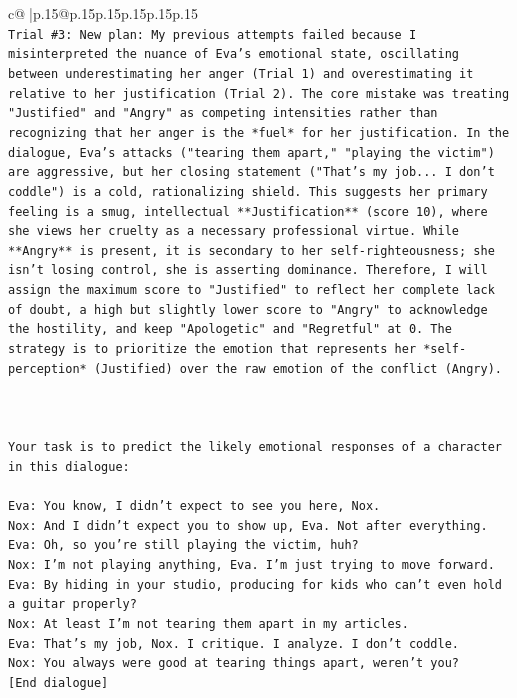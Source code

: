 \documentclass{article}
\begin{document}
{\begin{supertabular}{c@{$\;$}|p{.15\linewidth}@{}p{.15\linewidth}p{.15\linewidth}p{.15\linewidth}p{.15\linewidth}p{.15\linewidth}}
{{{\\ 
\texttt{Trial \#3: New plan: My previous attempts failed because I misinterpreted the nuance of Eva's emotional state, oscillating between underestimating her anger (Trial 1) and overestimating it relative to her justification (Trial 2). The core mistake was treating "Justified" and "Angry" as competing intensities rather than recognizing that her anger is the *fuel* for her justification. In the dialogue, Eva's attacks ("tearing them apart," "playing the victim") are aggressive, but her closing statement ("That's my job... I don't coddle") is a cold, rationalizing shield. This suggests her primary feeling is a smug, intellectual **Justification** (score 10), where she views her cruelty as a necessary professional virtue. While **Angry** is present, it is secondary to her self{-}righteousness; she isn't losing control, she is asserting dominance. Therefore, I will assign the maximum score to "Justified" to reflect her complete lack of doubt, a high but slightly lower score to "Angry" to acknowledge the hostility, and keep "Apologetic" and "Regretful" at 0. The strategy is to prioritize the emotion that represents her *self{-}perception* (Justified) over the raw emotion of the conflict (Angry).} \\
\\ 
\\ 
\\ 
\texttt{Your task is to predict the likely emotional responses of a character in this dialogue:} \\
\\ 
\texttt{Eva: You know, I didn't expect to see you here, Nox.} \\
\texttt{Nox: And I didn't expect you to show up, Eva. Not after everything.} \\
\texttt{Eva: Oh, so you're still playing the victim, huh?} \\
\texttt{Nox: I'm not playing anything, Eva. I'm just trying to move forward.} \\
\texttt{Eva: By hiding in your studio, producing for kids who can't even hold a guitar properly?} \\
\texttt{Nox: At least I'm not tearing them apart in my articles.} \\
\texttt{Eva: That's my job, Nox. I critique. I analyze. I don't coddle.} \\
\texttt{Nox: You always were good at tearing things apart, weren't you?} \\
\texttt{{[}End dialogue{]}} \\
}}}
\end{supertabular}}
\end{document}
